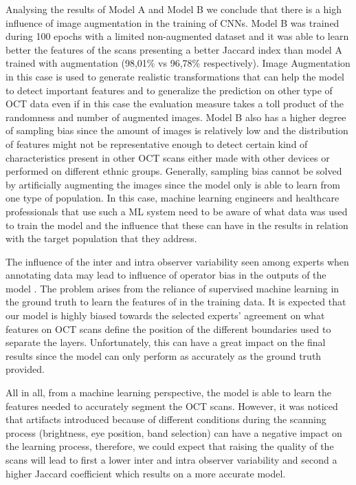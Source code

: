 \documentclass[12pt,a4paper]{scrartcl}
\begin{document}
Analysing the results of Model A and Model B we conclude that there is a high influence of image augmentation in the training of CNNs. Model B was trained during 100 epochs with a limited non-augmented dataset and it was able to learn better the features of the scans presenting a better Jaccard index than model A trained with augmentation (98,01\% vs 96,78\% respectively). Image Augmentation in this case is used to generate realistic transformations that can help the model to detect important features and to generalize the prediction on other type of OCT data even if in this case the evaluation measure takes a toll product of the randomness and number of augmented images. Model B also has a higher degree of sampling bias since the amount of images is relatively low and the distribution of features might not be representative enough to detect certain kind of characteristics present in other OCT scans either made with other devices or performed on different ethnic groups. Generally, sampling bias cannot be solved by artificially augmenting the images since the model only is able to learn from one type of population. In this case, machine learning engineers and healthcare professionals that use such a ML system need to be aware of what data was used to train the model and the influence that these can have in the results in relation with the target population that they address.


The influence of the inter and intra observer variability seen among experts when annotating data \cite{Maloca2019, Maloca2021, Ronchetti2019} may lead to 
influence of operator bias in the outputs of the model \cite{Gabr2016}. The problem arises from the reliance of supervised machine learning in the ground truth to learn the features of in the training data. It is expected that our model is highly biased towards the selected experts' agreement on what features on OCT scans define the position of the different boundaries used to separate the layers. Unfortunately, this can have a great impact on the final results since the model can only perform as accurately as the ground truth provided. 

All in all, from a machine learning perspective, the model is able to learn the features needed to accurately segment the OCT scans. However, it was noticed that artifacts introduced because of different conditions during the scanning process (brightness, eye position, band selection) can have a negative impact on the learning process, therefore, we could expect that raising the quality of the scans will lead to first a lower inter and intra observer variability and second a higher Jaccard coefficient which results on a more accurate model.
\end{document}
